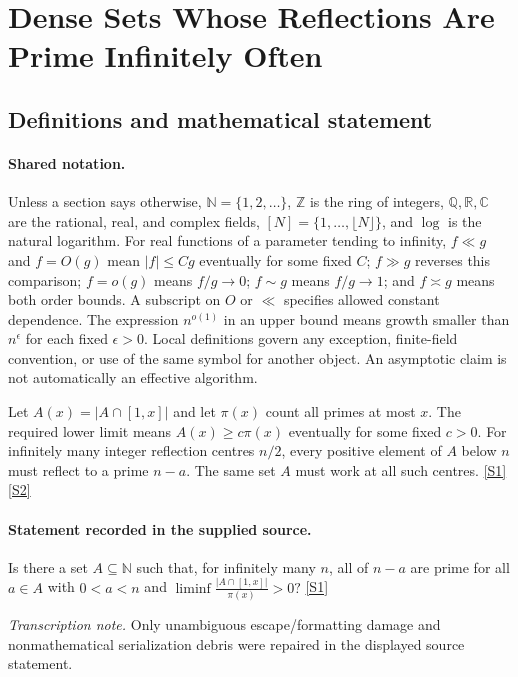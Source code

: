 \documentclass[11pt,a4paper]{article}
\newcommand{\N}{\mathbb{N}}
\newcommand{\Z}{\mathbb{Z}}
\newcommand{\Q}{\mathbb{Q}}
\newcommand{\R}{\mathbb{R}}
\newcommand{\C}{\mathbb{C}}
\newcommand{\sref}[2]{\hyperlink{source:#1:#2}{[S#2]}}
\begin{document}
\section{Dense Sets Whose Reflections Are Prime Infinitely Often}\label{statement}


\subsection{Definitions and mathematical statement}

\paragraph{Shared notation.}Unless a section says otherwise, $\N=\{1,2,\ldots\}$,
$\Z$ is the ring of integers, $\Q,\R,\C$ are the rational, real, and complex
fields, $[N]=\{1,\ldots,\lfloor N\rfloor\}$, and $\log$ is the natural
logarithm. For real functions of a parameter tending to infinity,
$f\ll g$ and $f=O(g)$ mean $|f|\leq Cg$ eventually for some fixed $C$;
$f\gg g$ reverses this comparison; $f=o(g)$ means $f/g\to0$;
$f\sim g$ means $f/g\to1$; and $f\asymp g$ means both order bounds.
A subscript on $O$ or $\ll$ specifies allowed constant dependence.
The expression $n^{o(1)}$ in an upper bound means growth smaller than
$n^\epsilon$ for each fixed $\epsilon>0$. Local definitions govern any
exception, finite-field convention, or use of the same symbol for another
object. An asymptotic claim is not automatically an effective algorithm.



Let $A(x)=|A\cap[1,x]|$ and let $\pi(x)$ count all primes at most $x$. The required lower limit means $A(x)\geq c\pi(x)$ eventually for some fixed $c>0$. For infinitely many integer reflection centres $n/2$, every positive element of $A$ below $n$ must reflect to a prime $n-a$. The same set $A$ must work at all such centres. \sref{statement}{1} \sref{statement}{2}

\paragraph{Statement recorded in the supplied source.}
Is there a set $A\subseteq \mathbb{N}$ such that, for infinitely many $n$, all of $n-a$ are prime for all $a\in A$ with $0<a<n$ and $ \liminf\frac{\lvert A\cap [1,x]\rvert}{\pi(x)}>0? $ \sref{statement}{1}

{\small\emph{Transcription note.} Only unambiguous escape/formatting damage and nonmathematical serialization debris were repaired in the displayed source statement.}
\end{document}
